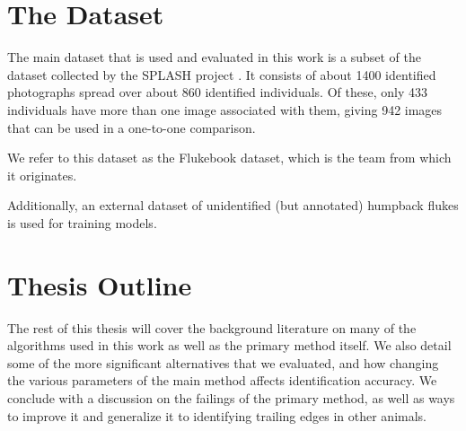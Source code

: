 

\section{The Dataset}

The main dataset that is used and evaluated in this work is a subset of the dataset collected by the SPLASH project \cite{calambokidis2008splash}. 
It consists of about 1400 identified photographs spread over about 860 identified individuals.
Of these, only 433 individuals have more than one image associated with them, giving 942 images that can be used in a one-to-one comparison.

We refer to this dataset as the Flukebook dataset, which is the team from which it originates. %

Additionally, an external dataset of unidentified (but annotated) humpback flukes is used for training models.

\section{Thesis Outline}

The rest of this thesis will cover the background literature on many of the algorithms used in this work as well as the primary method itself.
We also detail some of the more significant alternatives that we evaluated, and how changing the various parameters of the main method affects identification accuracy.
We conclude with a discussion on the failings of the primary method, as well as ways to improve it and generalize it to identifying trailing edges in other animals.




